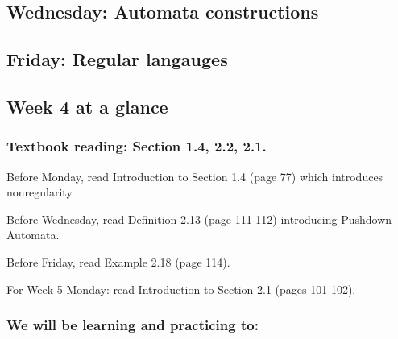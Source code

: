 \newpage
\subsection*{Wednesday: Automata constructions}



\newpage
\subsection*{Friday: Regular langauges}



\newpage

\subsection*{Week 4 at a glance}

\subsubsection*{Textbook reading: Section 1.4, 2.2, 2.1.}

\vspace{-15pt}

Before Monday, read Introduction to Section 1.4 (page 77) which introduces nonregularity.

Before Wednesday, read Definition 2.13 (page 111-112) introducing Pushdown Automata.

Before Friday, read Example 2.18 (page 114).

For Week 5 Monday: read Introduction to Section 2.1 (pages 101-102).

\vspace{-20pt}

\subsubsection*{We will be learning and practicing to:}

